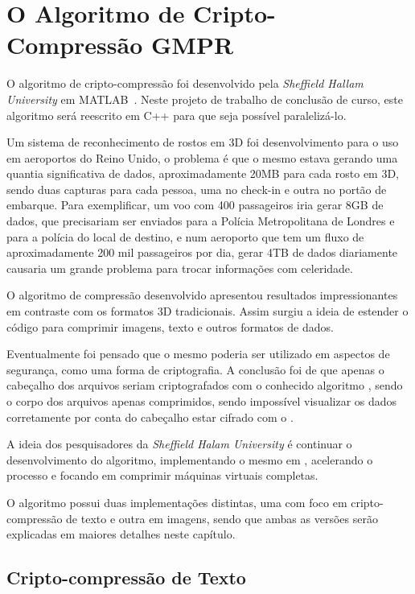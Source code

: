 \chapter{O Algoritmo de Cripto-Compressão GMPR}
\label{cap3}

O algoritmo de cripto-compressão \gmpr foi desenvolvido pela \textit{Sheffield Hallam University} em MATLAB~\cite{shu13715}. Neste projeto de trabalho de conclusão de curso, este algoritmo será reescrito em C++ para que seja possível paralelizá-lo.

Um sistema de reconhecimento de rostos em 3D foi desenvolvimento para o uso em aeroportos do Reino Unido, o problema é que o mesmo estava gerando uma quantia significativa de dados, aproximadamente 20MB para cada rosto em 3D, sendo duas capturas para cada pessoa, uma no check-in e outra no portão de embarque. Para exemplificar, um voo com 400 passageiros iria gerar 8GB de dados, que precisariam ser enviados para a Polícia Metropolitana de Londres e para a polícia do local de destino, e num aeroporto que tem um fluxo de aproximadamente 200 mil passageiros por dia, gerar 4TB de dados diariamente causaria um grande problema para trocar informações com celeridade.

O algoritmo de compressão desenvolvido apresentou resultados impressionantes em contraste com os formatos 3D tradicionais. Assim surgiu a ideia de estender o código para comprimir imagens, texto e outros formatos de dados.

Eventualmente foi pensado que o mesmo poderia ser utilizado em aspectos de segurança, como uma forma de criptografia. A conclusão foi de que apenas o cabeçalho dos arquivos seriam criptografados com o conhecido algoritmo \aes, sendo o corpo dos arquivos apenas comprimidos, sendo impossível visualizar os dados corretamente por conta do cabeçalho estar cifrado com o \aes.

A ideia dos pesquisadores da \textit{Sheffield Halam University} é continuar o desenvolvimento do algoritmo, implementando o mesmo em \fpgas, acelerando o processo e focando em comprimir máquinas virtuais completas.

O algoritmo \gmpr possui duas implementações distintas, uma com foco em cripto-compressão de texto e outra em imagens, sendo que ambas as versões serão explicadas em maiores detalhes neste capítulo.

\section{Cripto-compressão de Texto}

